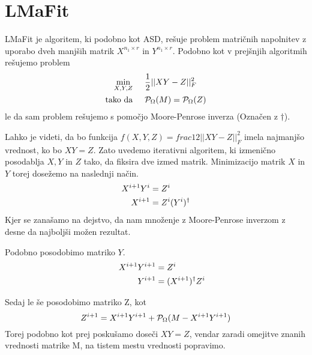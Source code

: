 \section{LMaFit}
LMaFit je algoritem, ki podobno kot ASD, rešuje problem matričnih napolnitev z uporabo dveh manjših matrik $X^{n_1 \times r}$ in $Y^{n_1 \times r}$. Podobno kot v prejšnjih algoritmih rešujemo problem 
\begin{align*}
    \min_{X, Y, Z}& \hspace{0.5cm} \frac{1}{2}||XY - Z||_F^2\\
    \text{tako da}& \hspace{0.5cm} \mathcal{P}_\Omega(M) = \mathcal{P}_\Omega(Z)
\end{align*}
le da sam problem rešujemo s pomočjo Moore-Penrose inverza (Označen z $\dagger$).

Lahko je videti, da bo funkcija $f(X,Y,Z) = frac{1}{2}||XY - Z||_F^2$ imela najmanjšo vrednost, ko bo $XY = Z$. Zato uvedemo iterativni algoritem, ki izmenično posodablja $X, Y$ in $Z$ tako, da fiksira dve izmed matrik. Minimizacijo matrik $X$ in $Y$ torej dosežemo na naslednji način.
\begin{align*}
    X^{i+1}Y^{i} &= Z^{i} \hspace{0.5cm} \\
    X^{i+1} &= Z^{i}(Y^i)^\dagger
\end{align*}
Kjer se zanašamo na dejstvo, da nam množenje z Moore-Penrose inverzom z desne 
da najboljši možen rezultat.

Podobno posodobimo matriko $Y$.
\begin{align*}
    \hspace{0.5cm} X^{i+1}Y^{i+1} &= Z^{i}   \\
    Y^{i+1} &= (X^{i+1})^\dagger Z^{i}
\end{align*}

Sedaj le še posodobimo matriko Z, kot
\[
    Z^{i+1} = X^{i+1}Y^{i+1} + \mathcal{P}_\Omega(M - X^{i+1}Y^{i+1})
\]
Torej podobno kot prej poskušamo doseči $XY = Z$, vendar zaradi omejitve znanih vrednosti matrike M, na tistem mestu vrednosti popravimo. \cite{LMaFit-WY12}
